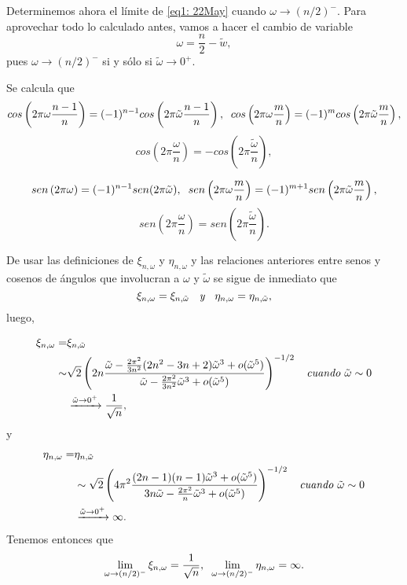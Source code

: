 Determinemos ahora el límite de
\eqref{eq1: 22May} cuando $\omega \rightarrow (n/2)^{-}$.
Para aprovechar todo lo calculado antes, vamos a hacer
el cambio de variable 
\[
\omega = \frac{n}{2} - \tilde{w},
\]
pues $\omega \rightarrow (n/2)^{-}$ si y sólo si
$\tilde{\omega} \rightarrow 0^{+}$.


Se calcula que 
\[
cos\left(
2 \pi \omega\frac{n-1}{n}
\right) = (-1)^{n-1} cos\left(
2 \pi \tilde{\omega}\frac{n-1}{n}
\right), \hspace{0.2cm}
cos\left(
2 \pi \omega\frac{m}{n}
\right) = (-1)^{m} cos\left(
2 \pi \tilde{\omega}\frac{m}{n}
\right), 
\]
\[
cos\left(
2 \pi \frac{\omega}{n}
\right) = -cos\left(
2 \pi \frac{\tilde{\omega}}{n}
\right), 
\]


\[
sen \left( 2 \pi \omega \right)
= (-1)^{n-1} sen (2 \pi \tilde{\omega})
, \hspace{0.2cm}
sen\left(
2 \pi \omega\frac{m}{n}
\right) = (-1)^{m+1} sen\left(
2 \pi \tilde{\omega}\frac{m}{n}
\right), 
\]
\[
sen\left(
2 \pi \frac{\omega}{n}
\right) = sen\left(
2 \pi \frac{\tilde{\omega}}{n}
\right).
\]

De usar las definiciones
de $\xi_{n, \omega}$ y $\eta_{n, \omega}$
y las relaciones anteriores entre senos y cosenos
de ángulos que involucran a $\omega$ y $\tilde{\omega}$
se sigue de inmediato que
\[
\xi_{n, \omega} = \xi_{n, \tilde{\omega}}
\hspace{0.2cm} \textit{ y } \hspace{0.2cm}
\eta_{n, \omega} = \eta_{n, \tilde{\omega}},
\]
luego, 

\begin{align*}
\xi_{n, \omega} = &
\xi_{n, \tilde{\omega}} \\
\sim &
\sqrt{2} 
\left(
2n
\frac{                                                                                                                                          
\tilde{\omega} - \frac{2\pi^{2}}{3n^{2}}(2n^2-3n+2)\tilde{\omega}^{3} 
+ o(\tilde{\omega}^{5})
}{
\tilde{\omega} -
\frac{2 \pi^{2}}{3 n^{2}} \tilde{\omega}^{3} + o(\tilde{\omega}^{5})
}
\right)^{-1/2}
\hspace{0.2cm} \textit{ cuando } \tilde{\omega} \sim 0
\\ &
\xrightarrow{\tilde{\omega} \rightarrow 0^{+}} 
\frac{1}{\sqrt{n}},
\end{align*}
y 
\begin{align*}
\eta_{n, \omega} = &
\eta_{n, \tilde{\omega}} \\
& \sim 
\sqrt{2} 
\left(
4\pi^{2}
\frac{
(2n-1)(n-1)\tilde{\omega}^{3} + o(\tilde{\omega}^{5})
}{
3 n \tilde{\omega} -
\frac{2 \pi^{2}}{n} \tilde{\omega}^{3} + o(\tilde{\omega}^{5})
}
\right)^{-1/2}  
\hspace{0.2cm} \textit{ cuando } \tilde{\omega} \sim 0
\\  &
\xrightarrow{\tilde{\omega} \rightarrow 0^{+}} 
\infty.
\end{align*}
Tenemos entonces que
\[
\lim\limits_{\omega \rightarrow (n/2)^{-}}{
\xi_{n, \omega}} = \frac{1}{\sqrt{n}},
\hspace{0.2cm}
\lim\limits_{\omega \rightarrow (n/2)^{-}}{
\eta_{n, \omega}} = \infty.
\]

